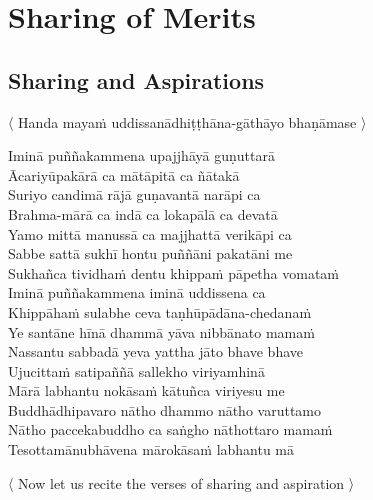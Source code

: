 
\chapter{Sharing of Merits}

\setsecheadstyle{\sectionFmt}

\section{Sharing and Aspirations}
\label{uddissanadhitthana}

\begin{leader}
  〈 Handa mayaṁ uddissanādhiṭṭhāna-gāthāyo bhaṇāmase 〉

\end{leader}

Iminā puññakammena upajjhāyā guṇuttarā\\
Ācariyūpakārā ca mātāpitā ca ñātakā\\
Suriyo candimā rājā guṇavantā narāpi ca\\
Brahma-mārā ca indā ca lokapālā ca devatā\\
Yamo mittā manussā ca majjhattā verikāpi ca\\
Sabbe sattā sukhī hontu puññāni pakatāni me\\
Sukhañca tividhaṁ dentu khippaṁ pāpetha vomataṁ\\
Iminā puññakammena iminā uddissena ca\\
Khippāhaṁ sulabhe ceva taṇhūpādāna-chedanaṁ\\
Ye santāne hīnā dhammā yāva nibbānato mamaṁ\\
Nassantu sabbadā yeva yattha jāto bhave bhave\\
Ujucittaṁ satipaññā sallekho viriyamhinā\\
Mārā labhantu nokāsaṁ kātuñca viriyesu me\\
Buddhādhipavaro nātho dhammo nātho varuttamo\\
Nātho paccekabuddho ca saṅgho nāthottaro mamaṁ\\
Tesottamānubhāvena mārokāsaṁ labhantu mā


\clearpage

\begin{leader}
  〈 Now let us recite the verses of sharing and aspiration 〉
\end{leader}

